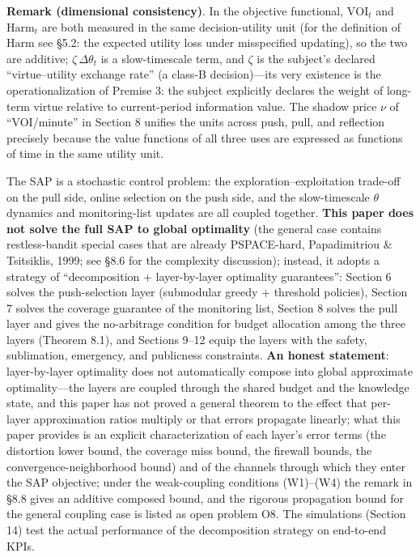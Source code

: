 \documentclass[
  11pt]{article}
\begin{document}
\textbf{Remark (dimensional consistency)}. In the objective functional,
\(\mathrm{VOI}_t\) and \(\mathrm{Harm}_t\) are both measured in the same
decision-utility unit (for the definition of \(\mathrm{Harm}\) see §5.2:
the expected utility loss under misspecified updating), so the two are
additive; \(\zeta\,\Delta\theta_t\) is a slow-timescale term, and
\(\zeta\) is the subject's declared ``virtue--utility exchange rate'' (a
class-B decision)---its very existence is the operationalization of
Premise 3: the subject explicitly declares the weight of long-term
virtue relative to current-period information value. The shadow price
\(\nu\) of ``VOI/minute'' in Section 8 unifies the units across push,
pull, and reflection precisely because the value functions of all three
uses are expressed as functions of time in the same utility unit.

The SAP is a stochastic control problem: the exploration--exploitation
trade-off on the pull side, online selection on the push side, and the
slow-timescale \(\theta\) dynamics and monitoring-list updates are all
coupled together. \textbf{This paper does not solve the full SAP to
global optimality} (the general case contains restless-bandit special
cases that are already PSPACE-hard, Papadimitriou \& Tsitsiklis, 1999;
see §8.6 for the complexity discussion); instead, it adopts a strategy
of ``decomposition + layer-by-layer optimality guarantees'': Section 6
solves the push-selection layer (submodular greedy + threshold
policies), Section 7 solves the coverage guarantee of the monitoring
list, Section 8 solves the pull layer and gives the no-arbitrage
condition for budget allocation among the three layers (Theorem 8.1),
and Sections 9--12 equip the layers with the safety, sublimation,
emergency, and publicness constraints. \textbf{An honest statement}:
layer-by-layer optimality does not automatically compose into global
approximate optimality---the layers are coupled through the shared
budget and the knowledge state, and this paper has not proved a general
theorem to the effect that per-layer approximation ratios multiply or
that errors propagate linearly; what this paper provides is an explicit
characterization of each layer's error terms (the distortion lower
bound, the coverage miss bound, the firewall bounds, the
convergence-neighborhood bound) and of the channels through which they
enter the SAP objective; under the weak-coupling conditions (W1)--(W4)
the remark in §8.8 gives an additive composed bound, and the rigorous
propagation bound for the general coupling case is listed as open
problem O8. The simulations (Section 14) test the actual performance of
the decomposition strategy on end-to-end KPIs.
\end{document}
